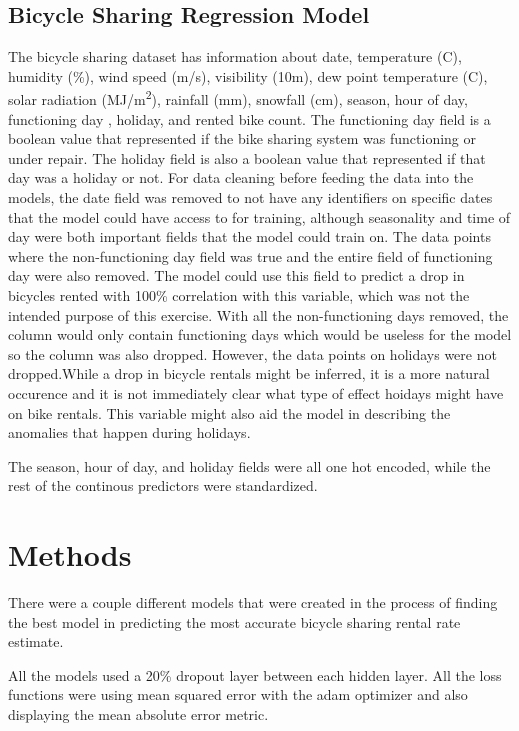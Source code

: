 \documentclass{article}
\begin{document}
    \subsection{Bicycle Sharing Regression Model}
    The bicycle sharing dataset has information about date, 
    temperature (\degree C), humidity (\%), wind speed (m/s), 
    visibility (10m),  dew point temperature (\degree C), 
    solar radiation (MJ/m\textsuperscript{2}), 
    rainfall (mm), snowfall (cm), season, hour of day, functioning day , holiday, 
    and rented bike count.
    The functioning day field is a boolean value that represented if the bike 
    sharing system was functioning or under repair.
    The holiday field is also a boolean value that represented if that day was 
    a holiday or not.
    For data cleaning before feeding the data into the models, the date field was 
    removed to not have any identifiers on specific dates that the model could have 
    access to for training, although seasonality and time of day were both important fields
    that the model could train on. The data points where the non-functioning day field
    was true and the entire field of functioning day were also removed. The model could use this field to predict a drop in 
    bicycles rented with 100\% correlation with this variable, which was not the 
    intended purpose of this exercise. With all the non-functioning days removed, the column would 
    only contain functioning days which would be useless for the model so the column was also dropped. 
    However, the data points on holidays were not dropped.While a drop in bicycle rentals 
    might be inferred, it is a more natural occurence and it is not immediately clear what 
    type of effect hoidays might have on bike rentals. This variable might also aid the model 
    in describing the anomalies that happen during holidays.

    The season, hour of day, and holiday fields were all one hot encoded, while the rest of the 
    continous predictors were standardized.


\section{Methods}
    There were a couple different models that were created in the process of finding the best model in predicting the most accurate
    bicycle sharing rental rate estimate. 

    All the models used a 20\% dropout layer between each hidden layer. All the loss functions were 
    using mean squared error with the adam optimizer and also displaying the mean absolute error metric.
\end{document}

